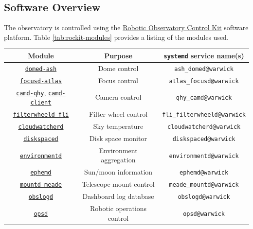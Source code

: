 \documentclass[12pt,a4paper]{article}
\begin{document}
\subsection{Software Overview}
The observatory is controlled using the \href{https://github.com/rockit-astro}{Robotic Observatory Control Kit} software platform. Table \ref{tab:rockit-modules} provides a listing of the modules used.
\begin{table}
    \centering
    \begin{tabular}{c|c|c}
        Module & Purpose & \texttt{systemd} service name(s)  \\
        \hline
        \href{https://github.com/rockit-astro/domed-ash}{\texttt{domed-ash}} & Dome control & \texttt{ash\_domed@warwick}\\
        \href{https://github.com/rockit-astro/focusd-atlas}{\texttt{focusd-atlas}} & Focus control & \texttt{atlas\_focusd@warwick}\\
        \href{https://github.com/rockit-astro/camd-qhy}{\texttt{camd-qhy}}, \href{https://github.com/rockit-astro/camd-client}{\texttt{camd-client}} & Camera control & \texttt{qhy\_camd@warwick}\\
        \href{https://github.com/rockit-astro/filterwheeld-fli}{\texttt{filterwheeld-fli}} & Filter wheel control & \texttt{fli\_filterwheeld@warwick}\\
        \href{https://github.com/rockit-astro/cloudwatcherd}{\texttt{cloudwatcherd}} & Sky temperature & \texttt{cloudwatcherd@warwick}\\
        \href{https://github.com/rockit-astro/diskspaced}{\texttt{diskspaced}} & Disk space monitor & \texttt{diskspaced@warwick}\\
        \href{https://github.com/rockit-astro/environmentd}{\texttt{environmentd}} & Environment aggregation & \texttt{environmentd@warwick}\\
        \href{https://github.com/rockit-astro/ephemd}{\texttt{ephemd}} & Sun/moon information & \texttt{ephemd@warwick}\\
        \href{https://github.com/rockit-astro/mountd-meade}{\texttt{mountd-meade}} & Telescope mount control & \texttt{meade\_mountd@warwick}\\
        \href{https://github.com/rockit-astro/obslogd}{\texttt{obslogd}} & Dashboard log database & \texttt{obslogd@warwick}\\
        \href{https://github.com/rockit-astro/opsd}{\texttt{opsd}} & Robotic operations control & \texttt{opsd@warwick}\\

\end{tabular}
\end{table}
\end{document}
